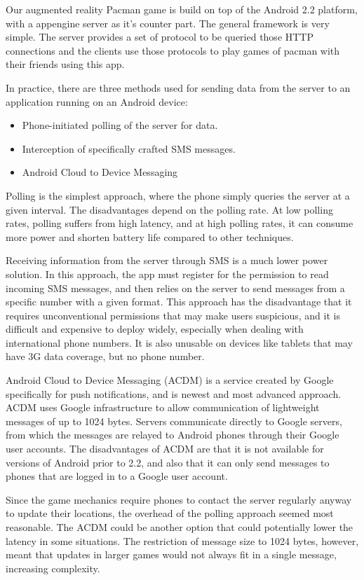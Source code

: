 \documentclass{acm_proc_article-sp}
\begin{document}
Our augmented reality Pacman game is build on top of the Android 2.2
platform, with a appengine server as it's counter part. The general
framework is very simple. The server provides a set of protocol to be
queried those HTTP connections and the clients use those protocols to
play games of pacman with their friends using this app.

In practice, there are three methods used for sending data from the server to
an application running on an Android device:
\begin{itemize}
\item Phone-initiated polling of the server for data.
\item Interception of specifically crafted SMS messages.
\item Android Cloud to Device Messaging
\end{itemize}

Polling is the simplest approach, where the phone simply queries the server at
a given interval. The disadvantages depend on the polling rate. At low polling
rates, polling suffers from high latency, and at high polling rates, it can
consume more power and shorten battery life compared to other techniques.

Receiving information from the server through SMS is a much lower power
solution. In this approach, the app must register for the permission to read
incoming SMS messages, and then relies on the server to send messages from a
specific number with a given format. This approach has the disadvantage that it
requires unconventional permissions that may make users suspicious, and it is
difficult and expensive to deploy widely, especially when dealing with
international phone numbers. It is also unusable on devices like tablets that
may have 3G data coverage, but no phone number.

Android Cloud to Device Messaging (ACDM) is a service created by Google
specifically for push notifications, and is newest and most advanced approach.
ACDM uses Google infrastructure to allow communication of lightweight messages
of up to 1024 bytes. Servers communicate directly to Google servers, from which
the messages are relayed to Android phones through their Google user accounts.
The disadvantages of ACDM are that it is not available for versions of Android
prior to 2.2, and also that it can only send messages to phones that are logged
in to a Google user account.

Since the game mechanics require phones to contact the server regularly anyway
to update their locations, the overhead of the polling approach seemed most
reasonable. The ACDM could be another option that could potentially lower the
latency in some situations. The restriction of message size to 1024 bytes,
however, meant that updates in larger games would not always fit in a single
message, increasing complexity.
\end{document}
